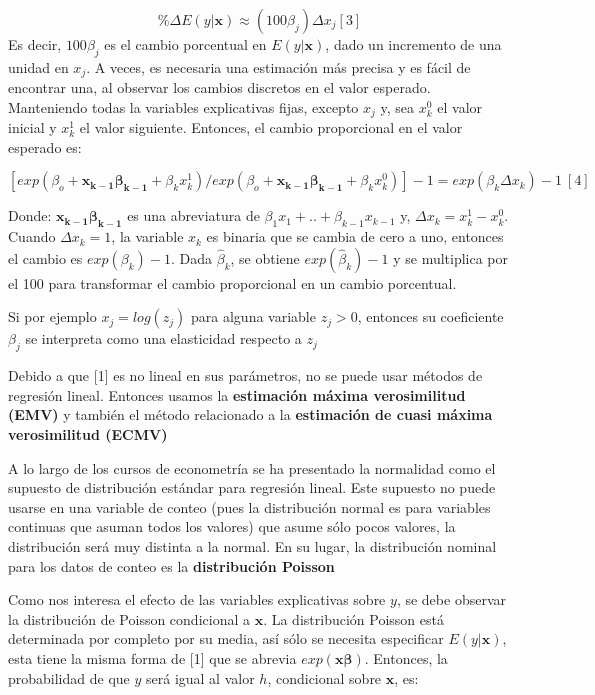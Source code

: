 \documentclass[
  letterpaper,
  DIV=11,
  numbers=noendperiod]{scrreprt}
\begin{document}
\[\%\Delta E(y|\mathbf{x})\approx(100\beta_j)\Delta x_j[3]\] Es decir,
\(100\beta_j\) es el cambio porcentual en \(E(y|\mathbf{x})\), dado un
incremento de una unidad en \(x_j\). A veces, es necesaria una
estimación más precisa y es fácil de encontrar una, al observar los
cambios discretos en el valor esperado. Manteniendo todas la variables
explicativas fijas, excepto \(x_j\) y, sea \(x_k^0\) el valor inicial y
\(x_k^1\) el valor siguiente. Entonces, el cambio proporcional en el
valor esperado es:

\[[exp(\beta_o+\mathbf{x_{k-1}\beta_{k-1}}+\beta_kx_k^1)/exp(\beta_o+\mathbf{x_{k-1}\beta_{k-1}}+\beta_kx_k^0)]-1=exp(\beta_k\Delta{x_k})-1\ [4]\]

Donde: \(\mathbf{x_{k-1}\beta_{k-1}}\) es una abreviatura de
\(\beta_1x_1+..+\beta_{k-1}x_{k-1}\) y, \(\Delta{x_k}=x_k^1-x_k^0\).
Cuando \(\Delta{x_k}=1\), la variable \(x_k\) es binaria que se cambia
de cero a uno, entonces el cambio es \(exp(\beta_k)-1\). Dada
\(\widehat{\beta}_k\), se obtiene \(exp(\widehat{\beta}_k)-1\) y se
multiplica por el 100 para transformar el cambio proporcional en un
cambio porcentual.

Si por ejemplo \(x_j=log(z_j)\) para alguna variable \(z_j>0\), entonces
su coeficiente \(\beta_j\) se interpreta como una elasticidad respecto a
\(z_j\)

Debido a que {[}1{]} es no lineal en sus parámetros, no se puede usar
métodos de regresión lineal. Entonces usamos la \textbf{estimación
máxima verosimilitud (EMV)} y también el método relacionado a la
\textbf{estimación de cuasi máxima verosimilitud (ECMV)}

A lo largo de los cursos de econometría se ha presentado la normalidad
como el supuesto de distribución estándar para regresión lineal. Este
supuesto no puede usarse en una variable de conteo (pues la distribución
normal es para variables continuas que asuman todos los valores) que
asume sólo pocos valores, la distribución será muy distinta a la normal.
En su lugar, la distribución nominal para los datos de conteo es la
\textbf{distribución Poisson}

Como nos interesa el efecto de las variables explicativas sobre \(y\),
se debe observar la distribución de Poisson condicional a
\(\mathbf{x}\). La distribución Poisson está determinada por completo
por su media, así sólo se necesita especificar \(E(y|\mathbf{x})\), esta
tiene la misma forma de {[}1{]} que se abrevia \(exp(\mathbf{x\beta})\).
Entonces, la probabilidad de que \(y\) será igual al valor \(h\),
condicional sobre \(\mathbf{x}\), es:
\end{document}

